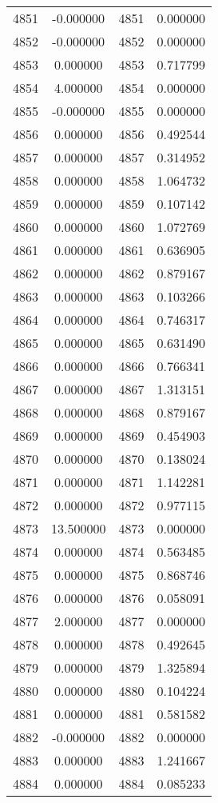 \documentclass[12pt]{article}
\begin{document}
\begin{longtable}{@{}cccc@{}}
4851 & -0.000000 & 4851 & 0.000000 \\
4852 & -0.000000 & 4852 & 0.000000 \\
4853 & 0.000000 & 4853 & 0.717799 \\
4854 & 4.000000 & 4854 & 0.000000 \\
4855 & -0.000000 & 4855 & 0.000000 \\
4856 & 0.000000 & 4856 & 0.492544 \\
4857 & 0.000000 & 4857 & 0.314952 \\
4858 & 0.000000 & 4858 & 1.064732 \\
4859 & 0.000000 & 4859 & 0.107142 \\
4860 & 0.000000 & 4860 & 1.072769 \\
4861 & 0.000000 & 4861 & 0.636905 \\
4862 & 0.000000 & 4862 & 0.879167 \\
4863 & 0.000000 & 4863 & 0.103266 \\
4864 & 0.000000 & 4864 & 0.746317 \\
4865 & 0.000000 & 4865 & 0.631490 \\
4866 & 0.000000 & 4866 & 0.766341 \\
4867 & 0.000000 & 4867 & 1.313151 \\
4868 & 0.000000 & 4868 & 0.879167 \\
4869 & 0.000000 & 4869 & 0.454903 \\
4870 & 0.000000 & 4870 & 0.138024 \\
4871 & 0.000000 & 4871 & 1.142281 \\
4872 & 0.000000 & 4872 & 0.977115 \\
4873 & 13.500000 & 4873 & 0.000000 \\
4874 & 0.000000 & 4874 & 0.563485 \\
4875 & 0.000000 & 4875 & 0.868746 \\
4876 & 0.000000 & 4876 & 0.058091 \\
4877 & 2.000000 & 4877 & 0.000000 \\
4878 & 0.000000 & 4878 & 0.492645 \\
4879 & 0.000000 & 4879 & 1.325894 \\
4880 & 0.000000 & 4880 & 0.104224 \\
4881 & 0.000000 & 4881 & 0.581582 \\
4882 & -0.000000 & 4882 & 0.000000 \\
4883 & 0.000000 & 4883 & 1.241667 \\
4884 & 0.000000 & 4884 & 0.085233 \\

\end{longtable}
\end{document}

